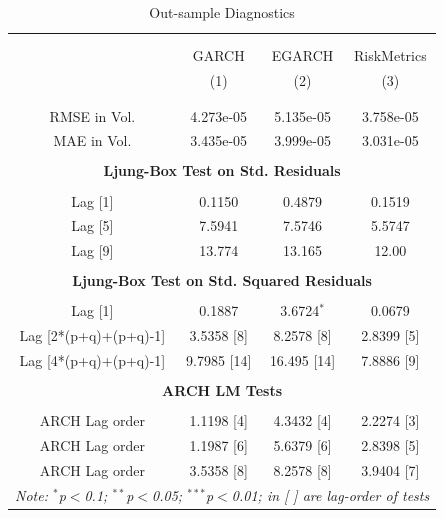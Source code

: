 \documentclass[a4paper]{article}
\begin{document}
\begin{table}[H] \centering 
  \caption{Out-sample Diagnostics} 
  \label{tab:diagnostic-out-riskmetrics} %
\begin{tabular}{@{\extracolsep{4pt}}cccc} 
\\[-1.8ex]\hline 
\hline \\[-1.8ex] 
 
\\[-1.8ex] & GARCH & EGARCH & RiskMetrics \\ 
& (1) & (2) & (3)  \\ 

\\[-1.8ex]\hline
\\[-1.8ex] RMSE in Vol. & 4.273e-05 & 5.135e-05 & 3.758e-05 \\ 
MAE in Vol. & 3.435e-05 & 3.999e-05 & 3.031e-05 \\ 
\hline \\[-1.8ex] 

\multicolumn{4}{c}{\textbf{Ljung-Box Test on Std. Residuals}}\\
\hline \\[-1.8ex] 
Lag [1] & 0.1150 & 0.4879 & 0.1519 \\ 
Lag [5] & 7.5941 & 7.5746 & 5.5747 \\ 
Lag [9] & 13.774 & 13.165 & 12.00 \\  
\hline \\[-1.8ex] 

\multicolumn{4}{c}{\textbf{Ljung-Box Test on Std. Squared Residuals}}\\
\hline \\[-1.8ex] 
Lag [1] & 0.1887 & 3.6724$^{*}$ & 0.0679  \\ 
Lag [2*(p+q)+(p+q)-1] & 3.5358 [8] & 8.2578 [8] & 2.8399 [5] \\ 
Lag [4*(p+q)+(p+q)-1] & 9.7985 [14] & 16.495 [14] & 7.8886 [9] \\
\hline \\[-1.8ex]

\multicolumn{4}{c}{\textbf{ARCH LM Tests}}\\
\hline \\[-1.8ex] 
ARCH Lag order & 1.1198 [4] & 4.3432 [4] & 2.2274 [3] \\ 
ARCH Lag order & 1.1987 [6] & 5.6379 [6] & 2.8398 [5] \\ 
ARCH Lag order & 3.5358 [8] & 8.2578 [8] & 3.9404 [7] \\

\hline 
\multicolumn{4}{c}{\textit{Note: $^{*}$p$<$0.1; $^{**}$p$<$0.05; $^{***}$p$<$0.01; in [ ] are lag-order of tests}}
\end{tabular} 
\end{table} 
\end{document}

